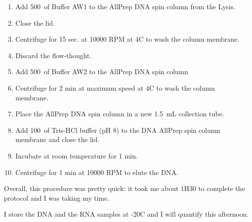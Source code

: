 \begin{enumerate}
\item Add 500~\uL of Buffer AW1 to the AllPrep DNA spin column from the Lysis.
\item Close the lid.
\item Centrifuge for 15 sec. at 10000 RPM at 4\degree C to wash the column membrane.
\item Discard the flow-thought.
\item Add 500~\uL of Buffer AW2 to the AllPrep DNA spin column
\item Centrifuge for 2 min at maximum speed at 4\degree C to wash the column membrane.
\item Place the AllPrep DNA spin column in a new 1.5~mL collection tube.
\item Add 100~\uL of Tris-HCl buffer (pH 8) to the DNA AllPrep spin column membrane and close the lid.
\item Incubate at room temperature for 1 min.
\item Centrifuge for 1 min at 10000 RPM to elute the DNA.
\end{enumerate}

Overall, this procedure was pretty quick: it took me about 1H30 to complete the protocol and I was taking my time. 

I store the DNA and the RNA samples at -20\degree C and I will quantify this afternoon.
